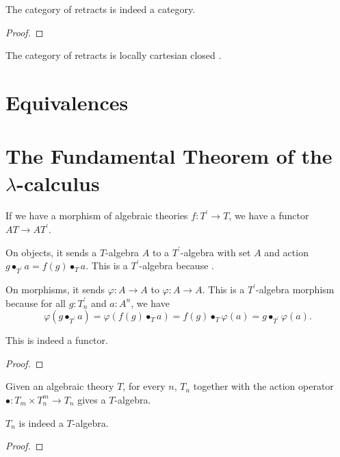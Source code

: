 \begin{lemma}
  The category of retracts is indeed a category.
\end{lemma}
\begin{proof}
  \TODO
\end{proof}

\begin{theorem}
  The category of retracts is locally cartesian closed \TODO.
\end{theorem}

\section{Equivalences}

\section{The Fundamental Theorem of the \texorpdfstring{$ \lambda $-}{lambda }calculus}

\begin{definition}
  If we have a morphism of algebraic theories $ f: T^\prime \to T $, we have a functor $ AT \to AT^\prime $.

  On objects, it sends a $ T $-algebra $ A $ to a $ T^\prime $-algebra with set $ A $ and action $ g \bullet_{T^\prime} a = f(g) \bullet_T a $. This is a $ T^\prime $-algebra because \TODO.

  On morphisms, it sends $ \varphi: A \to A $ to $ \varphi: A \to A $. This is a $ T^\prime $-algebra morphism because for all $ g: T^\prime_n $ and $ a: A^n $, we have
  \[ \varphi(g \bullet_{T^\prime} a) = \varphi(f(g) \bullet_T a) = f(g) \bullet_T \varphi(a) = g \bullet_{T^\prime} \varphi(a). \]
\end{definition}
\begin{lemma}
  This is indeed a functor.
\end{lemma}
\begin{proof}
  \TODO
\end{proof}

\begin{definition}
  Given an algebraic theory $ T $, for every $ n $, $ T_n $ together with the action operator $ \bullet: T_m \times T_n^m \to T_n $ gives a $ T $-algebra.
\end{definition}

\begin{lemma}
  $ T_n $ is indeed a $ T $-algebra.
\end{lemma}
\begin{proof}
  \TODO
\end{proof}

